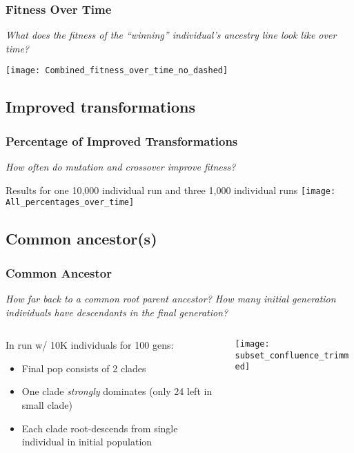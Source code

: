 \documentclass{beamer}
\begin{document}
\begin{frame}
\frametitle{Fitness Over Time}
\emph{What does the fitness of the ``winning'' individual's ancestry line look like over time?}
\begin{center}
\texttt{[image: Combined\_fitness\_over\_time\_no\_dashed]}
\end{center}
\end{frame}

\subsection{Improved transformations}

\begin{frame}
\frametitle{Percentage of Improved Transformations}
\emph{How often do mutation and crossover improve fitness?}
\begin{center}
{\tiny Results for one 10,000 individual run and three 1,000 individual runs}
\texttt{[image: All\_percentages\_over\_time]}
\end{center}
\end{frame}

\subsection{Common ancestor(s)}

\begin{frame}
\frametitle{Common Ancestor}
\emph{How far back to a common root parent ancestor? How many initial generation individuals have descendants in the final generation?}
\begin{columns}
\begin{column}{0.55\textwidth}
In run w/ 10K individuals for 100 gens:
\begin{itemize}
	\item Final pop consists of 2 clades
	\item One clade \emph{strongly} dominates (only 24 left in small clade)
	\item Each clade root-descends from single individual in initial population
\end{itemize}
\end{column}
\begin{column}{0.45\textwidth}
\begin{center}
\texttt{[image: subset\_confluence\_trimmed]}
\end{center}
\end{column}
\end{columns}
\end{frame}
\end{document}
